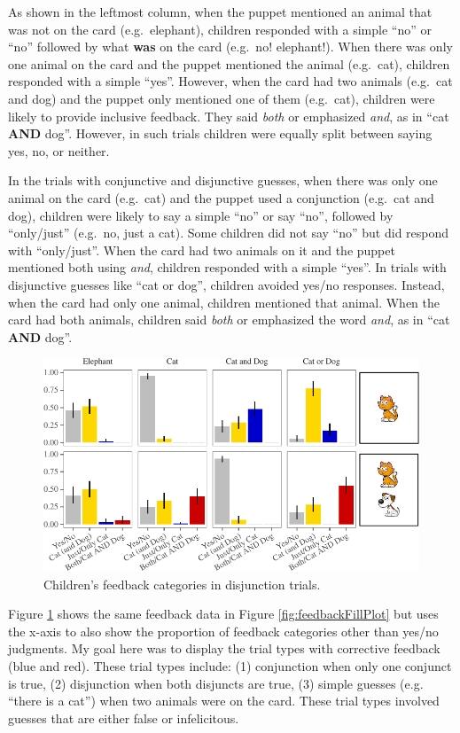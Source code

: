 \documentclass[oneside]{report}
\theoremstyle{definition}
\theoremstyle{definition}
\theoremstyle{definition}
\theoremstyle{remark}
\begin{document}
As shown in the leftmost column, when the puppet mentioned an animal
that was not on the card (e.g.~elephant), children responded with a
simple ``no'' or ``no'' followed by what \textbf{was} on the card
(e.g.~no! elephant!). When there was only one animal on the card and the
puppet mentioned the animal (e.g.~cat), children responded with a simple
``yes''. However, when the card had two animals (e.g.~cat and dog) and
the puppet only mentioned one of them (e.g.~cat), children were likely
to provide inclusive feedback. They said \emph{both} or emphasized
\emph{and}, as in ``cat \textbf{AND} dog''. However, in such trials
children were equally split between saying yes, no, or neither.

In the trials with conjunctive and disjunctive guesses, when there was
only one animal on the card (e.g.~cat) and the puppet used a conjunction
(e.g.~cat and dog), children were likely to say a simple ``no'' or say
``no'', followed by ``only/just'' (e.g.~no, just a cat). Some children
did not say ``no'' but did respond with ``only/just''. When the card had
two animals on it and the puppet mentioned both using \emph{and},
children responded with a simple ``yes''. In trials with disjunctive
guesses like ``cat or dog'', children avoided yes/no responses. Instead,
when the card had only one animal, children mentioned that animal. When
the card had both animals, children said \emph{both} or emphasized the
word \emph{and}, as in ``cat \textbf{AND} dog''.
\begin{figure}[t]

{\centering \includegraphics{figs/correctivePlot-1} 

}

\caption{Children's feedback categories in disjunction trials.}\label{fig:correctivePlot}
\end{figure}
Figure \ref{fig:correctivePlot} shows the same feedback data in Figure
\ref{fig:feedbackFillPlot} but uses the x-axis to also show the
proportion of feedback categories other than yes/no judgments. My goal
here was to display the trial types with corrective feedback (blue and
red). These trial types include: (1) conjunction when only one conjunct
is true, (2) disjunction when both disjuncts are true, (3) simple
guesses (e.g. ``there is a cat'') when two animals were on the card.
These trial types involved guesses that are either false or
infelicitous.
\end{document}
